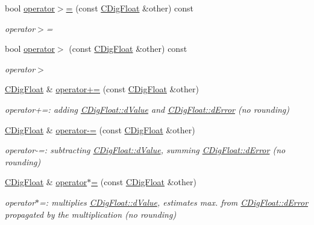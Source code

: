 \begin{DoxyCompactItemize}
bool \hyperlink{classCDigFloat_a08f4104630ae80e20f2768c28abea10f}{operator$>$=} (const \hyperlink{classCDigFloat}{C\+Dig\+Float} \&other) const
\begin{DoxyCompactList}\small\item\em operator$>$= \end{DoxyCompactList}\item 
bool \hyperlink{classCDigFloat_a06b58ba24f51ddcb737c826f2191d4c9}{operator$>$} (const \hyperlink{classCDigFloat}{C\+Dig\+Float} \&other) const
\begin{DoxyCompactList}\small\item\em operator$>$ \end{DoxyCompactList}\item 
\hyperlink{classCDigFloat}{C\+Dig\+Float} \& \hyperlink{classCDigFloat_a84b2ad9b4d1a75aae261074ed7c6fefe}{operator+=} (const \hyperlink{classCDigFloat}{C\+Dig\+Float} \&other)
\begin{DoxyCompactList}\small\item\em operator+=\+: adding \hyperlink{classCDigFloat_a4bbe69e30dd4e20527362493aa9aaf96}{C\+Dig\+Float\+::d\+Value} and \hyperlink{classCDigFloat_a25eb3782d1e727ff007a48f8308e3d4d}{C\+Dig\+Float\+::d\+Error} (no rounding) \end{DoxyCompactList}\item 
\hyperlink{classCDigFloat}{C\+Dig\+Float} \& \hyperlink{classCDigFloat_a7496a4f8445815e9a346076c3d90305a}{operator-\/=} (const \hyperlink{classCDigFloat}{C\+Dig\+Float} \&other)
\begin{DoxyCompactList}\small\item\em operator-\/=\+: subtracting \hyperlink{classCDigFloat_a4bbe69e30dd4e20527362493aa9aaf96}{C\+Dig\+Float\+::d\+Value}, summing \hyperlink{classCDigFloat_a25eb3782d1e727ff007a48f8308e3d4d}{C\+Dig\+Float\+::d\+Error} (no rounding) \end{DoxyCompactList}\item 
\hyperlink{classCDigFloat}{C\+Dig\+Float} \& \hyperlink{classCDigFloat_a9535d47a31a3f1cfa487cc8c567a4a12}{operator$\ast$=} (const \hyperlink{classCDigFloat}{C\+Dig\+Float} \&other)
\begin{DoxyCompactList}\small\item\em operator$\ast$=\+: multiplies \hyperlink{classCDigFloat_a4bbe69e30dd4e20527362493aa9aaf96}{C\+Dig\+Float\+::d\+Value}, estimates max. from \hyperlink{classCDigFloat_a25eb3782d1e727ff007a48f8308e3d4d}{C\+Dig\+Float\+::d\+Error} propagated by the multiplication (no rounding) \end{DoxyCompactList}\item 

\end{DoxyCompactItemize}
